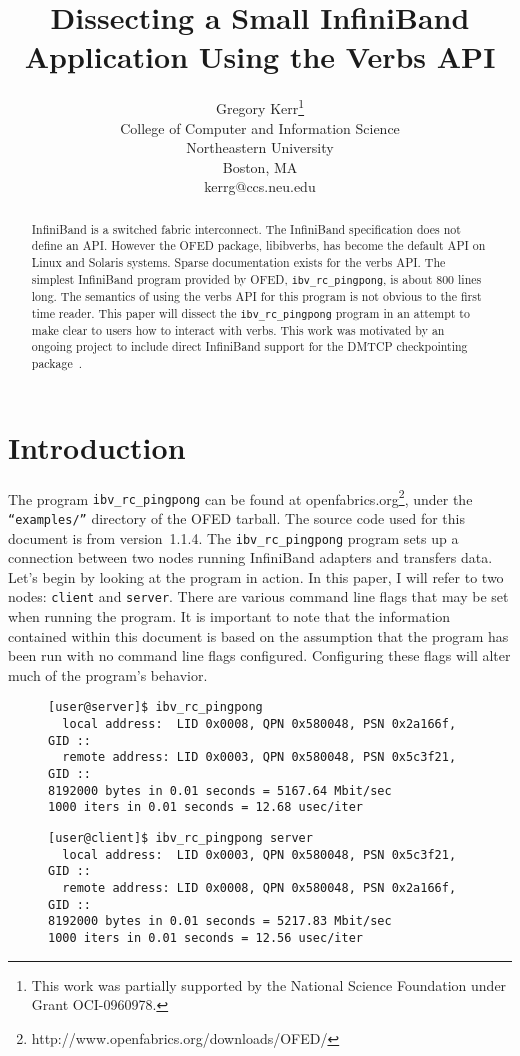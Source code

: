 \documentclass[letterpaper,12pt]{article}
\title{Dissecting a Small InfiniBand Application Using the Verbs API}
\author{Gregory Kerr\thanks{This work was partially supported by the
National Science Foundation under Grant OCI-0960978.} \\ College of
Computer and Information Science \\ Northeastern University \\ Boston,
MA \\ kerrg@ccs.neu.edu }
\date{}
\begin{document}
\maketitle

\begin{abstract}
InfiniBand is a switched fabric interconnect. The InfiniBand specification
does not define an API. However the OFED package, libibverbs, has become
the default API on Linux and Solaris systems.  Sparse documentation exists
for the verbs API. The simplest InfiniBand program provided by OFED,
{\tt ibv\_rc\_pingpong}, is about 800 lines long.  The semantics of using
the verbs API for this program is not obvious to the first time reader.
This paper will dissect the {\tt ibv\_rc\_pingpong} program in an attempt
to make clear to users how to interact with verbs. This work was motivated
by an ongoing project to include direct InfiniBand support for the DMTCP
checkpointing package~\cite{DMTCP}.
\end{abstract}

\section{Introduction}

The program {\tt ibv\_rc\_pingpong} can be found at
openfabrics.org\footnote{http://www.openfabrics.org/downloads/OFED/},
under the {\tt ``examples/''} directory of the OFED tarball. The source code
used for this document is from version~1.1.4. The {\tt ibv\_rc\_pingpong}
program
sets up a connection between two nodes running InfiniBand adapters
and transfers data.  Let's begin by looking at the program in action. In
this paper, I will refer to two nodes: {\tt client} and {\tt server}. There are
various command line flags that may be set when running the program. It is important
to note that the information contained within this document is based
on the assumption that the program has been run with no command line
flags configured. Configuring these flags will alter much of the program's behavior.

\begin{figure}
\begin{verbatim}
[user@server]$ ibv_rc_pingpong
  local address:  LID 0x0008, QPN 0x580048, PSN 0x2a166f, GID ::
  remote address: LID 0x0003, QPN 0x580048, PSN 0x5c3f21, GID ::
8192000 bytes in 0.01 seconds = 5167.64 Mbit/sec
1000 iters in 0.01 seconds = 12.68 usec/iter
\end{verbatim}

\begin{verbatim}
[user@client]$ ibv_rc_pingpong server
  local address:  LID 0x0003, QPN 0x580048, PSN 0x5c3f21, GID ::
  remote address: LID 0x0008, QPN 0x580048, PSN 0x2a166f, GID ::
8192000 bytes in 0.01 seconds = 5217.83 Mbit/sec
1000 iters in 0.01 seconds = 12.56 usec/iter
\end{verbatim}
\end{figure}
\end{document}
